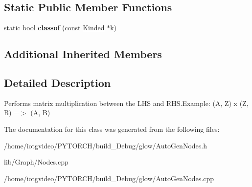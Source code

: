 \subsection*{Static Public Member Functions}
\begin{DoxyCompactItemize}
\item 
\mbox{\label{classglow_1_1_mat_mul_node_a352ff836433d757a17d1d929789b8c4d}} 
static bool {\bfseries classof} (const \hyperlink{classglow_1_1_kinded}{Kinded} $\ast$k)
\end{DoxyCompactItemize}
\subsection*{Additional Inherited Members}


\subsection{Detailed Description}
Performs matrix multiplication between the L\+HS and R\+H\+S.\+Example\+: (A, Z) x (Z, B) =$>$ (A, B) 

The documentation for this class was generated from the following files\+:\begin{DoxyCompactItemize}
\item 
/home/iotgvideo/\+P\+Y\+T\+O\+R\+C\+H/build\+\_\+\+Debug/glow/Auto\+Gen\+Nodes.\+h\item 
lib/\+Graph/Nodes.\+cpp\item 
/home/iotgvideo/\+P\+Y\+T\+O\+R\+C\+H/build\+\_\+\+Debug/glow/Auto\+Gen\+Nodes.\+cpp\end{DoxyCompactItemize}
